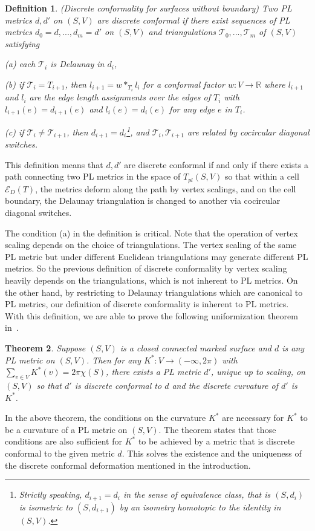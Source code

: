 \documentclass[11pt]{article}
\def\T{\mathcal{T}}
\newtheorem{theorem}{Theorem}[section]
\newtheorem{definition}[theorem]{Definition}
\begin{document}
\begin{definition} \label{dc}(Discrete conformality for surfaces without boundary)
 Two PL metrics $d, {d}'$ on $(S,V)$ are discrete conformal  if there exist sequences
 of PL
metrics $d_0=d, ..., d_m ={d}'$ on $(S, V)$ and triangulations
$\T_0, ..., \T_m$ of $(S, V)$  satisfying

(a) each $\T_i$ is Delaunay in $d_i$,

(b) if $\T_i=T_{i+1}$, then $l_{i+1} = w*_{T_i} l_i$ for a conformal factor $w: V\rightarrow \mathbb{R}$
where $l_{i+1}$ and $l_i$ are the edge length assignments over the edges of $T_i$ with $l_{i+1}(e) = d_{i+1}(e)$ and 
$l_i(e) = d_i(e)$ for any edge $e$ in $T_i$. 

(c) if $\T_i \neq \T_{i+1}$, then $d_{i+1} = d_{i}$\footnote{Strictly speaking, 
$d_{i+1}=d_{i}$ in the sense of equivalence class, that is  $(S, d_i)$ is isometric 
to $(S,d_{i+1})$ by an isometry homotopic to the identity in $(S, V)$.}, and $\T_i, \T_{i+1}$ are related by cocircular diagonal switches.
\end{definition}
This definition means that $d, {d}'$ are discrete conformal if and only if there exists a path 
connecting two PL metrics in the space of $T_{pl}(S, V)$
so that within a cell $\mathcal{E}_D(T)$, the metrics deform along the path by vertex scalings, 
and on the cell boundary, the Delaunay triangulation is changed to another
via cocircular diagonal switches.  

The condition (a) in the definition is critical. Note that the operation of vertex scaling 
depends on the choice of triangulations. The vertex scaling of the same PL metric but under different
Euclidean triangulations may generate different PL metrics. So the previous definition of discrete conformality 
by vertex scaling~\cite{Rocek, luo, bps} heavily depends on the triangulations, which is
not inherent to PL metrics. On the other hand, by restricting to Delaunay triangulations which are canonical 
to PL metrics, our definition of discrete conformality is inherent to PL metrics. With this definition, 
we are able to prove the following uniformization theorem in~\cite{glsw1}. 

\begin{theorem} \label{thm:main} Suppose $(S, V)$ is a closed connected marked surface
and  $d$ is any PL metric on $(S, V)$.  Then for any $K^*:V \to
(-\infty, 2\pi)$ with $\sum_{v \in V} K^*(v) =2\pi \chi(S)$, there
exists a PL metric $d'$, unique up to scaling,  on $(S, V)$ so
that $d'$ is discrete conformal to $d$ and the discrete curvature
of $d'$ is $K^*$. 
\end{theorem}
In the above theorem, the conditions on the curvature $K^*$ are necessary for
$K^*$ to be a curvature of a PL metric on $(S, V)$. The theorem states that those conditions are 
also sufficient for $K^*$ to be achieved by a metric that is discrete conformal to the given
metric $d$. This solves the existence and the uniqueness of the discrete conformal deformation 
mentioned in the introduction.
\end{document}
